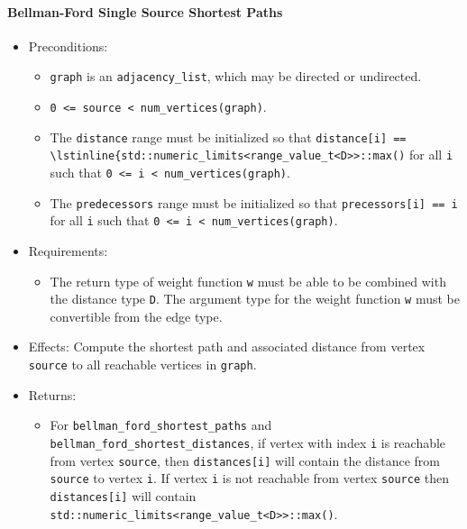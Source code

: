 \paragraph{Bellman-Ford Single Source Shortest Paths}

{\small

}

\begin{itemize}
\item[] Preconditions:
\begin{itemize}
\item[]
\lstinline{graph} is an \lstinline{adjacency_list}, which may be directed or
undirected.
\item[]
\lstinline{0 <= source < num_vertices(graph)}.
\item[]
  The \lstinline{distance} range must be initialized so that 
  \lstinline{distance[i] ==  \lstinline{std::numeric_limits<range_value_t<D>>::max()} 
  for all \lstinline{i}
  such that \lstinline{0 <= i < num_vertices(graph)}.  
\item[]
  The \lstinline{predecessors} range must be initialized so that
  \lstinline{precessors[i] == i} for all \lstinline{i} such that 
  \lstinline{0 <= i < num_vertices(graph)}.
\end{itemize}
\item[] Requirements: 
\begin{itemize}
\item[]
The return type of weight function \lstinline{w} must be able to
  be combined with the distance type \lstinline{D}.  The argument type for the weight
  function \lstinline{w} must be convertible from the edge type.
\end{itemize}
\item[] 
Effects: Compute the shortest path and associated distance from vertex
\lstinline{source} to all reachable vertices in \lstinline{graph}.
\item[] 
Returns:
\begin{itemize}
\item[] For \lstinline{bellman_ford_shortest_paths} and \lstinline{bellman_ford_shortest_distances},
  if vertex with index \lstinline{i} is reachable from vertex \lstinline{source}, then
  \lstinline{distances[i]} will contain the distance from \lstinline{source} to vertex
  \lstinline{i}.  If vertex \lstinline{i} is not reachable from vertex
  \lstinline{source} then \lstinline{distances[i]} will contain
  \lstinline{std::numeric_limits<range_value_t<D>>::max()}.

\end{itemize}
\end{itemize}
